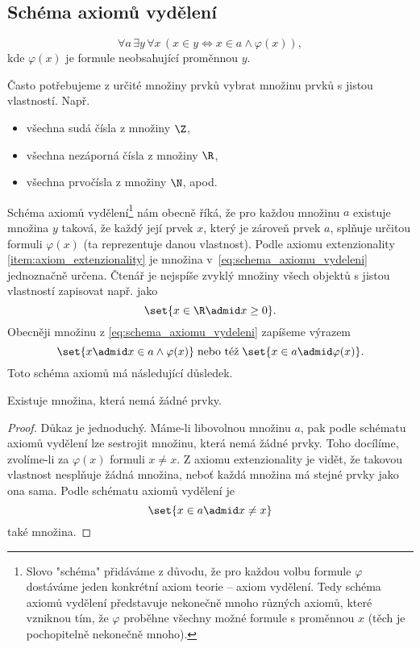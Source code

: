 \subsection{Schéma axiomů vydělení}
\begin{equation}\label{eq:schema_axiomu_vydeleni}
    \forall a\,\exists y\,\forall x\,(x\in y \iff x\in a \land \varphi(x)),
\end{equation}
kde $\varphi(x)$ je formule neobsahující proměnnou $y$.\par
Často potřebujeme z určité množiny prvků vybrat množinu prvků s jistou vlastností. Např.
\begin{itemize}
    \item všechna sudá čísla z množiny $\Z$,
    \item všechna nezáporná čísla z množiny $\R$,
    \item všechna prvočísla z množiny $\N$, apod.
\end{itemize}
Schéma axiomů vydělení\footnote{Slovo "schéma" přidáváme z důvodu, že pro každou volbu formule $\varphi$ dostáváme jeden konkrétní axiom teorie -- axiom vydělení. Tedy schéma axiomů vydělení představuje nekonečně mnoho různých axiomů, které vzniknou tím, že $\varphi$ proběhne všechny možné formule s proměnnou $x$ (těch je pochopitelně nekonečně mnoho).} nám obecně říká, že pro každou množinu $a$ existuje množina $y$ taková, že každý její prvek $x$, který je zároveň prvek $a$, splňuje určitou formuli $\varphi(x)$ (ta reprezentuje danou vlastnost). Podle axiomu extenzionality \ref{item:axiom_extenzionality} je množina v~\eqref{eq:schema_axiomu_vydeleni} jednoznačně určena. Čtenář je nejspíše zvyklý množiny všech objektů s jistou vlastností zapisovat např. jako
\begin{equation*}
    \set{x\in\R \admid x\geq 0}.
\end{equation*}
Obecněji množinu z \eqref{eq:schema_axiomu_vydeleni} zapíšeme výrazem
\begin{equation*}
    \set{x \admid x\in a \land \varphi(x)}\;\text{nebo též}\;\set{x\in a\admid \varphi(x)}.
\end{equation*}
Toto schéma axiomů má následující důsledek.
\needspace{6mm}
\begin{corollary}
    Existuje množina, která nemá žádné prvky.
\end{corollary}
\begin{proof}
    Důkaz je jednoduchý. Máme-li libovolnou množinu $a$, pak podle schématu axiomů vydělení lze sestrojit množinu, která nemá žádné prvky. Toho docílíme, zvolíme-li za $\varphi(x)$ formuli $x\neq x$. Z axiomu extenzionality je vidět, že takovou vlastnost nesplňuje žádná množina, neboť každá množina má stejné prvky jako ona sama. Podle schématu axiomů vydělení je
    \begin{equation*}
        \set{x\in a \admid x\neq x}
    \end{equation*}
    také množina.
\end{proof}

